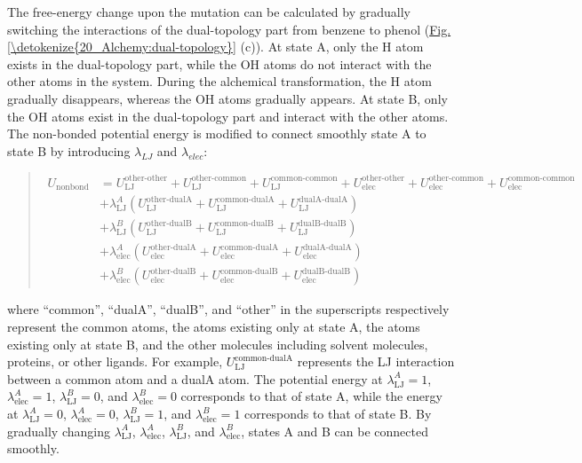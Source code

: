 \documentclass[a4paper,11pt,oneside,english]{sphinxmanual}
\begin{document}
The free-energy change upon the mutation can be calculated by gradually switching the interactions of the dual-topology part from benzene to phenol (\hyperref[\detokenize{20_Alchemy:dual-topology}]{Fig.\@ \ref{\detokenize{20_Alchemy:dual-topology}}} (c)).
At state A, only the H atom exists in the dual-topology part, while the OH atoms do not interact with the other atoms in the system.
During the alchemical transformation, the H atom gradually disappears, whereas the OH atoms gradually appears.
At state B, only the OH atoms exist in the dual-topology part and interact with the other atoms.
The non-bonded potential energy is modified to connect smoothly state A to state B by introducing \(\lambda_{LJ}\) and \(\lambda_{elec}\):
\begin{quote}

\vspace{-5mm}
\begin{equation*}
\begin{split}U_{\text{nonbond}} &= U_{\text{LJ}}^{\text{other-other}} + U_{\text{LJ}}^{\text{other-common}} + U_{\text{LJ}}^{\text{common-common}} + U_{\text{elec}}^{\text{other-other}} + U_{\text{elec}}^{\text{other-common}} + U_{\text{elec}}^{\text{common-common}} \\
    & + \lambda_{\text{LJ}}^A (U_{\text{LJ}}^{\text{other-dualA}} + U_{\text{LJ}}^{\text{common-dualA}} + U_{\text{LJ}}^{\text{dualA-dualA}}) \\
    & + \lambda_{\text{LJ}}^B (U_{\text{LJ}}^{\text{other-dualB}} + U_{\text{LJ}}^{\text{common-dualB}} + U_{\text{LJ}}^{\text{dualB-dualB}}) \\
    & + \lambda_{\text{elec}}^A (U_{\text{elec}}^{\text{other-dualA}} + U_{\text{elec}}^{\text{common-dualA}} + U_{\text{elec}}^{\text{dualA-dualA}}) \\
    & + \lambda_{\text{elec}}^B (U_{\text{elec}}^{\text{other-dualB}} + U_{\text{elec}}^{\text{common-dualB}} + U_{\text{elec}}^{\text{dualB-dualB}})\end{split}
\end{equation*}
\vspace{-3mm}
\end{quote}

where “common”, “dualA”, “dualB”, and “other” in the superscripts respectively represent the common atoms, the atoms existing only at state A, the atoms existing only at state B, and the other molecules including solvent molecules, proteins, or other ligands.
For example, \(U_{\text{LJ}}^{\text{common-dualA}}\) represents the LJ interaction between a common atom and a dualA atom.
The potential energy at \(\lambda_{\text{LJ}}^{A}=1\), \(\lambda_{\text{elec}}^{A}=1\), \(\lambda_{\text{LJ}}^{B}=0\), and \(\lambda_{\text{elec}}^{B}=0\) corresponds to that of state A, while the energy at \(\lambda_{\text{LJ}}^{A}=0\), \(\lambda_{\text{elec}}^{A}=0\), \(\lambda_{\text{LJ}}^{B}=1\), and \(\lambda_{\text{elec}}^{B}=1\) corresponds to that of state B.
By gradually changing \(\lambda_{\text{LJ}}^{A}\), \(\lambda_{\text{elec}}^{A}\), \(\lambda_{\text{LJ}}^{B}\), and \(\lambda_{\text{elec}}^{B}\), states A and B can be connected smoothly.
\end{document}
